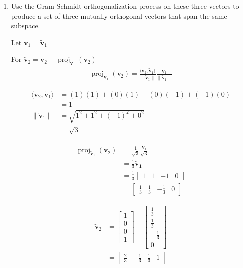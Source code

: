 \documentclass{tufte-book}
\DeclareMathOperator{\proj}{proj}
\newcommand{\vct}{\mathbf}
\newcommand{\dprod}[2]{\langle #1, #2 \rangle}
\theoremstyle{mytheoremstyle}
\theoremstyle{mylemstyle}
\theoremstyle{mydefstyle}
\begin{document}
\begin{enumerate}
\item Use the Gram-Schmidt orthogonalization process on these three vectors to produce a set of three mutually orthogonal vectors that span the same subspace.

Let $\vct{v}_1 = \vct{\tilde{v}}_1$

For $\vct{\tilde{v}}_2 = \vct{v}_2 - \proj_{\vct{\tilde{v}}_1}(\vct{v}_2)$
\begin{align*}
\proj_{\vct{\tilde{v}}_1}(\vct{v}_2) = \frac{\dprod{\vct{v}_2}{\vct{\tilde{v}}_1}}{\|\vct{\tilde{v}}_1\|}\frac{\vct{\tilde{v}}_1}{\|\vct{\tilde{v}}_1\|}
\end{align*}

\begin{align*}
\dprod{\vct{v}_2}{\vct{\tilde{v}}_1} &= (1)(1) + (0)(1) + (0)({-1}) +(-1)(0)\\
&=1 \\
\|\vct{\tilde{v}}_1\| &= \sqrt{1^2+1^2+(-1)^2+0^2} \\
&= \sqrt{3}
\end{align*}

\begin{align*}
\proj_{\vct{\tilde{v}}_1}(\vct{v}_2) &= \frac{1}{\sqrt{3}}\frac{\vct{\tilde{v}}_1}{\sqrt{3}}\\
&= \frac{1}{3}\vct{\tilde{v}_1}\\
&= \frac{1}{3}
\begin{bmatrix}
1&1&-1&0
\end{bmatrix} \\
&=
\begin{bmatrix}
\frac{1}{3} & \frac{1}{3} &-\frac{1}{3} & 0
\end{bmatrix}
\end{align*}

\begin{align*}
\vct{\tilde{v}}_2 &= 
\begin{bmatrix}
1 \\
0 \\
0 \\ 
1 
\end{bmatrix}
-
\begin{bmatrix}
\frac{1}{3} \\
\frac{1}{3} \\ 
{-\frac{1}{3}} \\
0
\end{bmatrix} \\
&=
\begin{bmatrix}
\frac{2}{3} & -\frac{1}{3} &\frac{1}{3} & 1
\end{bmatrix}
\end{align*}



\end{enumerate}
\end{document}
